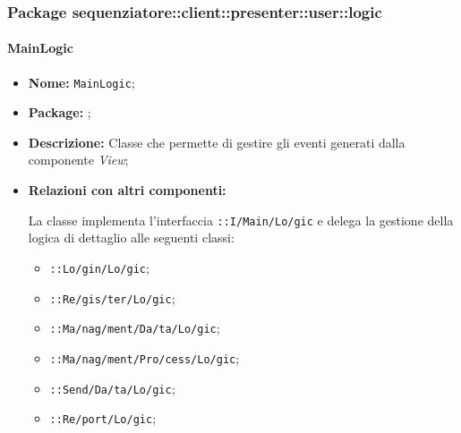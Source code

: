 \iffalse
model::localdataprocessowner::ProcessOwnerData
\fi

\subsubsection{Package sequenziatore::client::presenter::user::logic}

\paragraph{MainLogic}
\begin{flushleft}
\begin{itemize}
\item \textbf{Nome:} \texttt{MainLogic};
\item \textbf{Package:} \texttt{\logicUser{}};
\item \textbf{Descrizione:} Classe che permette di gestire gli eventi generati dalla componente \textit{View};
\item \textbf{Relazioni con altri componenti:}
\begin{sloppypar}
La classe implementa l'interfaccia \texttt{\iLogicUser{}::I\fshyp{}Main\fshyp{}Lo\fshyp{}gic} e delega la gestione della logica di dettaglio alle seguenti classi:
\end{sloppypar}
\begin{itemize}
\item \texttt{\logicUser{}::Lo\fshyp{}gin\fshyp{}Lo\fshyp{}gic};
\item \texttt{\logicUser{}::Re\fshyp{}gis\fshyp{}ter\fshyp{}Lo\fshyp{}gic};
\item \texttt{\logicUser{}::Ma\fshyp{}nag\fshyp{}ment\fshyp{}Da\fshyp{}ta\fshyp{}Lo\fshyp{}gic};
\item \texttt{\logicUser{}::Ma\fshyp{}nag\fshyp{}ment\fshyp{}Pro\fshyp{}cess\fshyp{}Lo\fshyp{}gic};
\item \texttt{\logicUser{}::Send\fshyp{}Da\fshyp{}ta\fshyp{}Lo\fshyp{}gic};
\item \texttt{\logicUser{}::Re\fshyp{}port\fshyp{}Lo\fshyp{}gic};
\end{itemize}
\end{itemize}
\end{flushleft}

